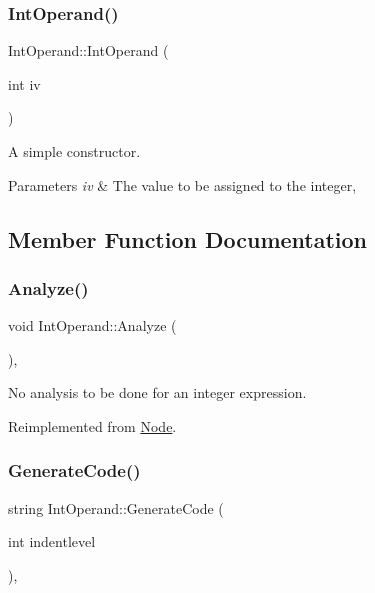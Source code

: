 \subsubsection{\texorpdfstring{Int\+Operand()}{IntOperand()}}
{\footnotesize\ttfamily Int\+Operand\+::\+Int\+Operand (\begin{DoxyParamCaption}\item[{int}]{iv }\end{DoxyParamCaption})}

A simple constructor. 
\begin{DoxyParams}{Parameters}
{\em iv} & The value to be assigned to the integer, \\
\hline
\end{DoxyParams}


\subsection{Member Function Documentation}
\mbox{\label{class_int_operand_ac509fc25d25b9a69b63ddbdf54f5a353}} 
\subsubsection{\texorpdfstring{Analyze()}{Analyze()}}
{\footnotesize\ttfamily void Int\+Operand\+::\+Analyze (\begin{DoxyParamCaption}{ }\end{DoxyParamCaption})\hspace{0.3cm}{\ttfamily [inline]}, {\ttfamily [virtual]}}

No analysis to be done for an integer expression. 

Reimplemented from \hyperlink{class_node_a5f88d55c6f253a29def7ccc443d83d47}{Node}.

\mbox{\label{class_int_operand_aeaaef4fc5e36f9154dbe66c6b3f471e6}} 
\subsubsection{\texorpdfstring{Generate\+Code()}{GenerateCode()}}
{\footnotesize\ttfamily string Int\+Operand\+::\+Generate\+Code (\begin{DoxyParamCaption}\item[{int}]{indentlevel }\end{DoxyParamCaption})\hspace{0.3cm}{\ttfamily [inline]}, {\ttfamily [virtual]}}

